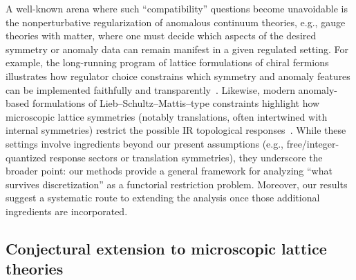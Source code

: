 \documentclass[aps,prx,reprint,superscriptaddress,twocolumn,amsmath,amssymb,amsfonts, nofootinbib]{revtex4-2}
\theoremstyle{apsstyle}
\begin{document}
A well-known arena where such ``compatibility” questions become unavoidable is the nonperturbative regularization of anomalous continuum theories, e.g., gauge theories with matter, where one must decide which aspects of the desired symmetry or anomaly data can remain manifest in a given regulated setting. For example, the long-running program of lattice formulations of chiral fermions illustrates how regulator choice constrains which symmetry and anomaly features can be implemented faithfully and transparently~\cite{Ginsparg1982, Kaplan1992}. Likewise, modern anomaly-based formulations of Lieb–Schultz–Mattis–type constraints highlight how microscopic lattice symmetries (notably translations, often intertwined with internal symmetries) restrict the possible IR topological responses~\cite{Seiberg_Cheng, Zou2026}. While these settings involve ingredients beyond our present assumptions (e.g., free/integer-quantized response sectors or translation symmetries), they underscore the broader point: our methods provide a general framework for analyzing ``what survives discretization” as a functorial restriction problem. Moreover, our results suggest a systematic route to extending the analysis once those additional ingredients are incorporated.



\subsection{Conjectural extension to microscopic lattice theories}
\label{sec:microscopic_continuum_conjecture}
\end{document}

